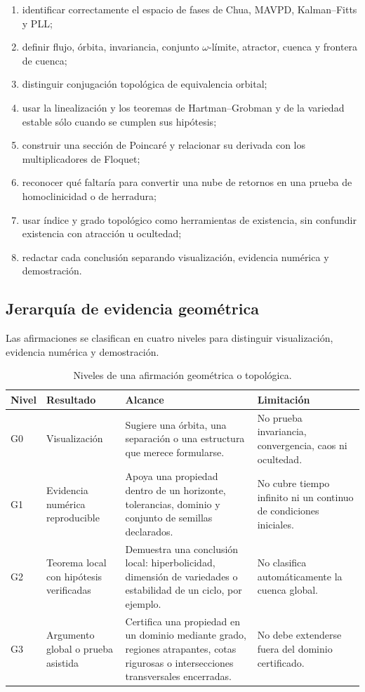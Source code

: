 \begin{enumerate}
  \item identificar correctamente el espacio de fases de Chua, MAVPD,
        Kalman--Fitts y PLL;
  \item definir flujo, órbita, invariancia, conjunto \(\omega\)-límite,
        atractor, cuenca y frontera de cuenca;
  \item distinguir conjugación topológica de equivalencia orbital;
  \item usar la linealización y los teoremas de Hartman--Grobman y de la
        variedad estable sólo cuando se cumplen sus hipótesis;
  \item construir una sección de Poincaré y relacionar su derivada con los
        multiplicadores de Floquet;
  \item reconocer qué faltaría para convertir una nube de retornos en una
        prueba de homoclinicidad o de herradura;
  \item usar índice y grado topológico como herramientas de existencia, sin
        confundir existencia con atracción u ocultedad;
  \item redactar cada conclusión separando visualización, evidencia numérica y
        demostración.
\end{enumerate}

\fi

\subsection{Jerarquía de evidencia geométrica}
\label{geo:subsec:jerarquia-evidencia}

Las afirmaciones se clasifican en cuatro niveles para distinguir visualización,
evidencia numérica y demostración.

\begin{table}[H]
\centering
\caption{Niveles de una afirmación geométrica o topológica.}
\label{geo:tab:niveles-evidencia}
\small
\begin{tabularx}{\textwidth}{@{}L{0.12\textwidth}L{0.22\textwidth}YY@{}}
\toprule
Nivel & Resultado & Alcance & Limitación \\
\midrule
G0 & Visualización & Sugiere una órbita, una separación o una estructura que
merece formularse. & No prueba invariancia, convergencia, caos ni ocultedad. \\
G1 & Evidencia numérica reproducible & Apoya una propiedad dentro de un
horizonte, tolerancias, dominio y conjunto de semillas declarados. & No cubre
tiempo infinito ni un continuo de condiciones iniciales. \\
G2 & Teorema local con hipótesis verificadas & Demuestra una conclusión local:
hiperbolicidad, dimensión de variedades o estabilidad de un ciclo, por
ejemplo. & No clasifica automáticamente la cuenca global. \\
G3 & Argumento global o prueba asistida & Certifica una propiedad en un dominio
mediante grado, regiones atrapantes, cotas rigurosas o intersecciones
transversales encerradas. & No debe extenderse fuera del dominio certificado.
\\
\bottomrule
\end{tabularx}
\end{table}

